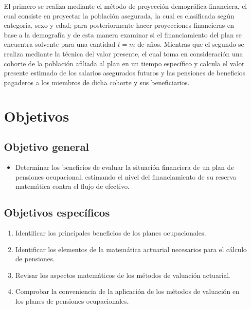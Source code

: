 \documentclass[12pt,letterpaper,titlepage]{article}
\begin{document}
El primero se realiza mediante el método de proyección demográfica-financiera, el cual consiste en proyectar la población asegurada, la cual es clasificada según categoría, sexo y edad; para posteriormente hacer proyecciones financieras en base a la demografía y de esta manera examinar si el financiamiento del plan se encuentra solvente para una cantidad $t=m$ de años. Mientras que el segundo se realiza mediante la técnica del valor presente, el cual toma en consideración una cohorte de la población afiliada al plan en un tiempo específico y calcula el valor presente estimado de los salarios asegurados futuros y las pensiones de beneficios pagaderos a los miembros de dicha cohorte y sus beneficiarios.

\newpage

\section{Objetivos}


\subsection{Objetivo general}

\begin{itemize}
	\item Determinar los beneficios de evaluar la situación financiera de un plan de pensiones ocupacional, estimando el nivel del financiamiento de su reserva matemática contra el flujo de efectivo.
\end{itemize}


\subsection{Objetivos específicos}

\begin{enumerate}
	\item Identificar los principales beneficios de los planes ocupacionales.
	\item Identificar los elementos de la matemática actuarial necesarios para el cálculo de pensiones.
	\item Revisar los aspectos matemáticos de los métodos de valuación actuarial.
	\item Comprobar la conveniencia de la aplicación de los métodos de valuación en los planes de pensiones ocupacionales. 
\end{enumerate}
\end{document}
